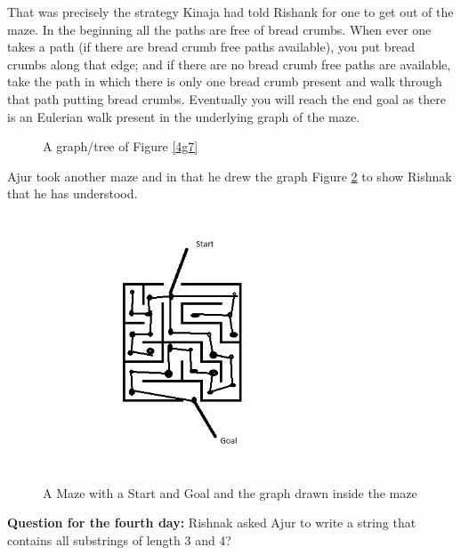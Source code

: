 That was precisely the strategy Kinaja had told Rishank for one to get out of the maze.  In the beginning all the paths are free of bread crumbs. When ever one takes a path (if there are bread crumb free paths available), you put bread crumbs along that edge; and if there are no bread crumb free paths are available, take the path in which there is only one bread crumb present and walk through that path putting bread crumbs. Eventually you will reach the end goal as there is an Eulerian walk present in the underlying graph of the maze. %

\begin{figure}
\begin{center}
\caption{ A graph/tree of Figure \ref{4g7}}\label{4g8}
\end{center}
\end{figure}

Ajur took another maze and in that he drew the graph Figure \ref{4g9} to show Rishnak that he has understood.

\begin{figure}
\begin{center}
\includegraphics[width=0.7\textwidth]{anothermaze.jpg}
\caption{A Maze with a Start and Goal and the graph drawn inside the maze}\label{4g9}
\end{center}
\end{figure}
\vspace{3in}
\textbf{Question for the fourth day:}
Rishnak asked Ajur to write a string that contains all substrings of length 3 and 4?

